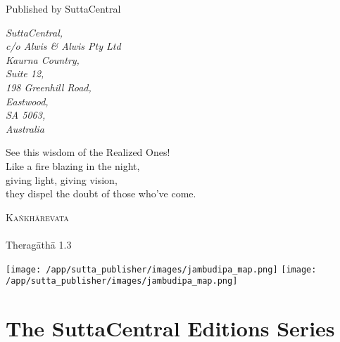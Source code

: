 \documentclass[12pt,openany]{book}%
\newcommand{\blankpage}{
\newpage
\thispagestyle{empty}
\mbox{}
\newpage
}
\newcommand*{\epigraphTranslatedTitle}[1]{\vspace*{.5em}\footnotesize\textsc{#1}\\}%
\newcommand*{\epigraphRootTitle}[1]{\footnotesize\textit{#1}\\}%
\newcommand*{\epigraphReference}[1]{\footnotesize{#1}}%
\begin{document}
\begin{footnotesize}
\medskip

Published by SuttaCentral

\medskip

\textit{SuttaCentral,\\
c/o Alwis \& Alwis Pty Ltd\\
Kaurna Country,\\
Suite 12,\\
198 Greenhill Road,\\
Eastwood,\\
SA 5063,\\
Australia}

\end{footnotesize}

\newpage

\setlength{\parindent}{1em}%
\newpage

\vspace*{\fill}

\begin{center}
\epigraph{See this wisdom of the Realized Ones!\\
Like a fire blazing in the night,\\
giving light, giving vision,\\
they dispel the doubt of those who’ve come.}
{
\epigraphTranslatedTitle{\textsanskrit{Kaṅkhārevata}}
\epigraphRootTitle{}
\epigraphReference{\textsanskrit{Theragāthā} 1.3}
}
\end{center}

\vspace*{2in}

\vspace*{\fill}

\setlength{\parindent}{0em}
\sbox{}%
\texttt{[image: /app/sutta\_publisher/images/jambudipa\_map.png]}
\newpage
\texttt{[image: /app/sutta\_publisher/images/jambudipa\_map.png]}
\newpage
\restoregeometry

\blankpage%

\setlength{\parindent}{1em}
%
\tableofcontents
\newpage
\pagestyle{fancy}
%
\chapter*{The SuttaCentral Editions Series}
\end{document}
